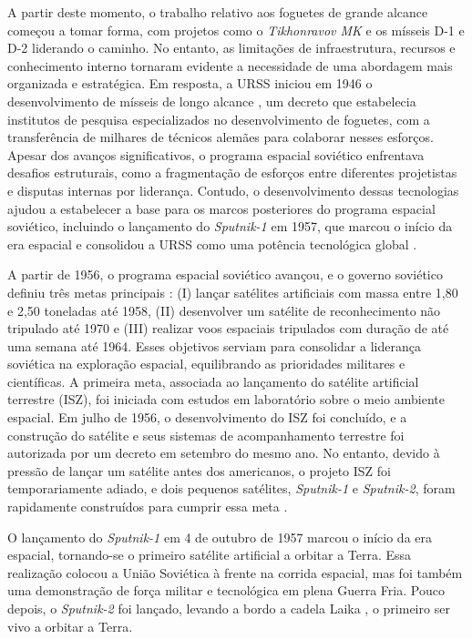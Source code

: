 A partir deste momento, o trabalho relativo aos foguetes de grande alcance começou a tomar forma, com projetos como o \emph{Tikhonravov MK} e os mísseis D-1 e D-2 liderando o caminho.
No entanto, as limitações de infraestrutura, recursos e conhecimento interno tornaram evidente a necessidade de uma abordagem mais organizada e estratégica. 
Em resposta, a URSS iniciou em 1946 o desenvolvimento de mísseis de longo alcance \cite{siddiqi2004}, um decreto que estabelecia institutos de pesquisa especializados no desenvolvimento de foguetes, com a transferência de milhares de técnicos alemães para colaborar nesses esforços.
Apesar dos avanços significativos, o programa espacial soviético enfrentava desafios estruturais, como a fragmentação de esforços entre diferentes projetistas e disputas internas por liderança.
Contudo, o desenvolvimento dessas tecnologias ajudou a estabelecer a base para os marcos posteriores do programa espacial soviético, incluindo o lançamento do \emph{Sputnik-1} em 1957, que marcou o início da era espacial e consolidou a URSS como uma potência tecnológica global \cite{betzler2024}.

A partir de 1956, o programa espacial soviético avançou, e o governo soviético definiu três metas principais \cite{betzler2024}: (I) lançar satélites artificiais com massa entre 1,80 e 2,50 toneladas até 1958, (II) desenvolver um satélite de reconhecimento não tripulado até 1970 e (III) realizar voos espaciais tripulados com duração de até uma semana até 1964.
Esses objetivos serviam para consolidar a liderança soviética na exploração espacial, equilibrando as prioridades militares e científicas.
A primeira meta, associada ao lançamento do satélite artificial terrestre (ISZ), foi iniciada com estudos em laboratório sobre o meio ambiente espacial.
Em julho de 1956, o desenvolvimento do ISZ foi concluído, e a construção do satélite e seus sistemas de acompanhamento terrestre foi autorizada por um decreto em setembro do mesmo ano.
No entanto, devido à pressão de lançar um satélite antes dos americanos, o projeto ISZ foi temporariamente adiado, e dois pequenos satélites, \emph{Sputnik-1} e \emph{Sputnik-2}, foram rapidamente construídos para cumprir essa meta \cite{betzler2024}.

O lançamento do \emph{Sputnik-1} em 4 de outubro de 1957 \cite{nasaSputnik1} marcou o início da era espacial, tornando-se o primeiro satélite artificial a orbitar a Terra.
Essa realização colocou a União Soviética à frente na corrida espacial, mas foi também uma demonstração de força militar e tecnológica em plena Guerra Fria.
Pouco depois, o \emph{Sputnik-2} foi lançado, levando a bordo a cadela Laika \cite{nasaSputnik2}, o primeiro ser vivo a orbitar a Terra.

